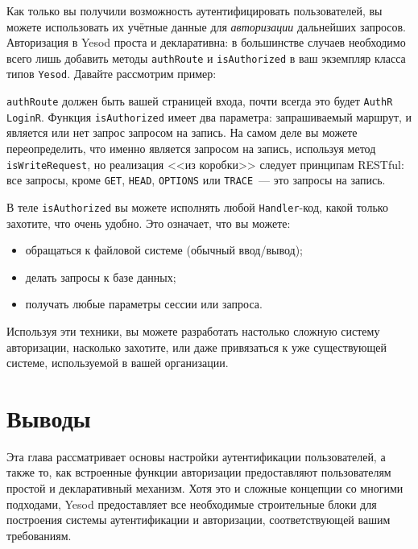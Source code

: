 Как только вы получили возможность аутентифицировать пользователей, вы можете
использовать их учётные данные для \emph{авторизации} дальнейших запросов.
Авторизация в Yesod проста и декларативна: в большинстве случаев необходимо
всего лишь добавить методы \lstinline'authRoute' и \lstinline'isAuthorized' в
ваш экземпляр класса типов \lstinline'Yesod'. Давайте рассмотрим пример:


\lstinline'authRoute' должен быть вашей страницей входа, почти всегда это будет
\lstinline'AuthR LoginR'. Функция \lstinline'isAuthorized' имеет два параметра:
запрашиваемый маршрут, и является или нет запрос запросом на запись. На самом
деле вы можете переопределить, что именно является запросом на запись,
используя метод \lstinline'isWriteRequest', но реализация <<из коробки>>
следует принципам RESTful: все запросы, кроме \lstinline'GET',
\lstinline'HEAD', \lstinline'OPTIONS' или \lstinline'TRACE'~--- это запросы на
запись.

В теле \lstinline'isAuthorized' вы можете исполнять любой
\lstinline'Handler'-код, какой только захотите, что очень удобно. Это означает,
что вы можете:

\begin{itemize}
    \item обращаться к файловой системе (обычный ввод/вывод);

    \item делать запросы к базе данных;

    \item получать любые параметры сессии или запроса.
\end{itemize}

Используя эти техники, вы можете разработать настолько сложную систему
авторизации, насколько захотите, или даже привязаться к уже существующей
системе, используемой в вашей организации.

\section{Выводы}

Эта глава рассматривает основы настройки аутентификации пользователей, а также
то, как встроенные функции авторизации предоставляют пользователям простой и
декларативный механизм. Хотя это и сложные концепции со многими подходами,
Yesod предоставляет все необходимые строительные блоки для построения системы
аутентификации и авторизации, соответствующей вашим требованиям.
